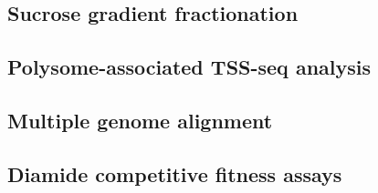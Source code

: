\subsection{Sucrose gradient fractionation}

\subsection{Polysome-associated TSS-seq analysis}

\subsection{Multiple genome alignment}

\subsection{Diamide competitive fitness assays}

\newpage

\begingroup
\singlespacing

\endgroup
